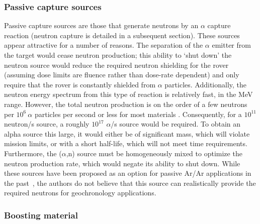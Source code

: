 \documentclass{mc2015}
\begin{document}
\subsubsection{Passive capture sources}

Passive capture sources \cite{weise_neutron_1984,jacobs_energy_1983,marsh_high_1995} are those that generate neutrons by an $\alpha$ capture reaction (neutron capture is detailed in a subsequent section). These sources appear attractive for a number of reasons. The separation of the $\alpha$ emitter from the target would cease neutron production; this ability to `shut down' the neutron source would reduce the required neutron shielding for the rover (assuming dose limits are fluence rather than dose-rate dependent) and only require that the rover is constantly shielded from $\alpha$ particles.  Additionally, the neutron energy spectrum from this type of reaction is relatively fast, in the MeV range. However, the total neutron production is on the order of a few  neutrons per $10^6\:\alpha$ particles per second or less for most materials \cite{weise_neutron_1984,jacobs_energy_1983}. Consequently, for a $10^{11}$ neutron/s source, a roughly $10^{17}$ $\alpha$/s source would be required. To obtain an alpha source this large, it would either be of significant mass, which will violate mission limits, or with a short half-life, which will not meet time requirements. Furthermore, the ($\alpha$,n) source must be homogeneously mixed to optimize the neutron production rate, which would negate its ability to shut down. While these sources have been proposed as an option for passive Ar/Ar applications in the past~\cite{li_evaluation_2011}, the authors do not believe that this source can realistically provide the required neutrons for geochronology applications. 

\subsubsection{Boosting material}
\end{document}

